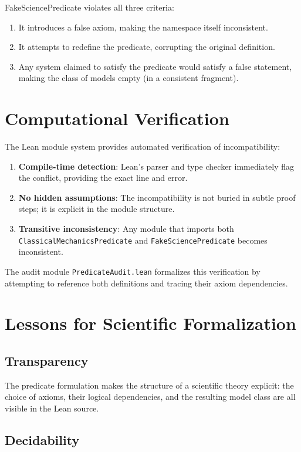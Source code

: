 \documentclass[11pt]{article}
\begin{document}
FakeSciencePredicate violates all three criteria:
\begin{enumerate}
  \item It introduces a false axiom, making the namespace itself inconsistent.
  \item It attempts to redefine the predicate, corrupting the original definition.
  \item Any system claimed to satisfy the predicate would satisfy a false
    statement, making the class of models empty (in a consistent fragment).
\end{enumerate}

\section{Computational Verification}

The Lean module system provides automated verification of incompatibility:
\begin{enumerate}
  \item \textbf{Compile-time detection}: Lean's parser and type checker
    immediately flag the conflict, providing the exact line and error.
  \item \textbf{No hidden assumptions}: The incompatibility is not buried in
    subtle proof steps; it is explicit in the module structure.
  \item \textbf{Transitive inconsistency}: Any module that imports both
    \texttt{ClassicalMechanicsPredicate} and \texttt{FakeSciencePredicate}
    becomes inconsistent.
\end{enumerate}

The audit module \texttt{PredicateAudit.lean} formalizes this verification
by attempting to reference both definitions and tracing their axiom
dependencies.

\section{Lessons for Scientific Formalization}

\subsection{Transparency}

The predicate formulation makes the structure of a scientific theory explicit:
the choice of axioms, their logical dependencies, and the resulting model class
are all visible in the Lean source.

\subsection{Decidability}
\end{document}
